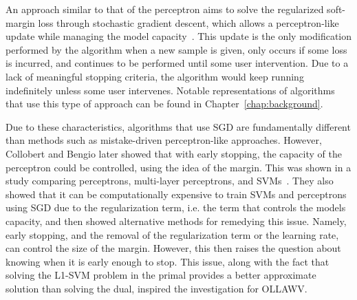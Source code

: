 \documentclass[reqno]{vcuthesis}
\numberwithin{equation}{chapter}
\begin{document}
An approach similar to that of the perceptron aims to solve the regularized soft-margin loss through stochastic gradient descent, which allows a perceptron-like update while managing the model capacity~\cite{panagiotakopoulos2013stochastic}. This update is the only modification performed by the algorithm when a new sample is given, only occurs if some loss is incurred, and continues to be performed until some user intervention. Due to a lack of meaningful stopping criteria, the algorithm would keep running indefinitely unless some user intervenes. Notable representations of algorithms that use this type of approach can be found in Chapter~\ref{chap:background}. 

Due to these characteristics, algorithms that use SGD are fundamentally different than methods such as mistake-driven perceptron-like approaches. However, Collobert and Bengio later showed that with early stopping, the capacity of the perceptron could be controlled, using the idea of the margin. This was shown in a study comparing perceptrons, multi-layer perceptrons, and SVMs~\cite{collobert2004links}. They also showed that it can be computationally expensive to train SVMs and perceptrons using SGD due to the regularization term, i.e. the term that controls the models capacity, and then showed alternative methods for remedying this issue. Namely, early stopping, and the removal of the regularization term or the learning rate, can control the size of the margin. However, this then raises the question about knowing when it is early enough to stop. This issue, along with the fact that solving the L1-SVM problem in the primal provides a better approximate solution than solving the dual, inspired the investigation for OLLAWV.
\end{document}
